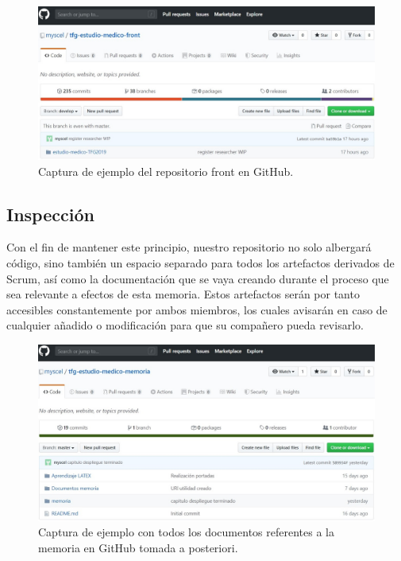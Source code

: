 \begin{itemize}
    \begin{figure}[h]
    \centering
     \includegraphics[width=1\textwidth]{images/GitHubFront.jpg}
    \caption{Captura de ejemplo del repositorio front en GitHub.}
    \end{figure}
    \end{itemize}
    
    \subsection{Inspección}
    Con el fin de mantener este principio, nuestro repositorio no solo albergará código, sino también un espacio separado para todos los artefactos derivados de Scrum, así como la documentación que se vaya creando durante el proceso que sea relevante a efectos de esta memoria. Estos artefactos serán por tanto accesibles constantemente por ambos miembros, los cuales avisarán en caso de cualquier añadido o modificación para que su compañero pueda revisarlo.\newline
    
    \begin{figure}[h]
    \centering
     \includegraphics[width=1\textwidth]{images/GitHubMemoria.jpg}
    \caption{Captura de ejemplo con todos los documentos referentes a la memoria en GitHub tomada a posteriori.}
    \end{figure}
    \newpage
    
